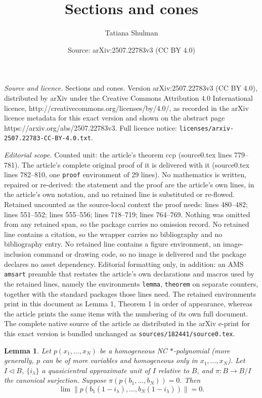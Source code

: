 \documentclass[10pt,a4paper]{amsart}
\title{Sections and cones}
\author{Tatiana Shulman}
\date{Source: arXiv:2507.22783v3 (CC BY 4.0)}
\newtheorem{lemma}{Lemma}
\begin{document}
\maketitle

\noindent\emph{Source and licence.} Sections and cones. Version arXiv:2507.22783v3 (CC BY 4.0), distributed by arXiv under the Creative Commons Attribution 4.0 International licence, http://creativecommons.org/licenses/by/4.0/, as recorded in the arXiv licence metadata for this exact version and shown on the abstract page https://arxiv.org/abs/2507.22783v3. Full licence notice: \texttt{licenses/arxiv-2507.22783-CC-BY-4.0.txt}.\par\smallskip

\noindent\textit{Editorial scope.} Counted unit: the article's theorem ccp (source0.tex lines 779--781). The article's complete original proof of it is delivered with it (source0.tex lines 782--810, one \texttt{proof} environment of 29 lines). No mathematics is written, repaired or re-derived: the statement and the proof are the article's own lines, in the article's own notation, and no retained line is substituted or re-flowed.  Retained uncounted as the source-local context the proof needs: lines 480--482; lines 551--552; lines 555--556; lines 718--719; lines 764--769.  Nothing was omitted from any retained span, so the package carries no omission record.  No retained line contains a citation, so the wrapper carries no bibliography and no bibliography entry.  No retained line contains a figure environment, an image-inclusion command or drawing code, so no image is delivered and the package declares no asset dependency.  Editorial formatting only, in addition: an AMS \texttt{amsart} preamble that restates the article's own declarations and macros used by the retained lines, namely the environments \texttt{lemma}, \texttt{theorem} on separate counters, together with the standard packages those lines need.  The retained environments print in this document as Lemma 1, Theorem 1 in order of appearance, whereas the article prints the same items with the numbering of its own full document.  The complete native source of the article as distributed in the arXiv e-print for this exact version is bundled unchanged as \texttt{sources/182441/source0.tex}.
\begin{lemma}\label{AsHom1}  Let $p (x_1, \ldots, x_N) $ be a homogeneous NC $\ast$-polynomial (more generally, $p$ can be of more variables and homogeneous only in $x_1, \ldots, x_N$). Let $I \lhd B$, $\{i_{\lambda}\}$ a quasicientral approximate unit of $I$ relative to $B$, and $\pi: B \to B/I$  the canonical surjection.
 Suppose $\pi(p(b_1, \ldots, b_N)) = 0$. Then $$\lim \|p(b_1(1-i_{\lambda}), \ldots, b_N(1-i_{\lambda}))\| =0.$$
\end{lemma}
\end{document}
